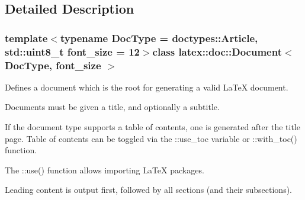 \subsection{Detailed Description}
\subsubsection*{template$<$typename Doc\-Type = doctypes\-::\-Article, std\-::uint8\-\_\-t font\-\_\-size = 12$>$class latex\-::doc\-::\-Document$<$ Doc\-Type, font\-\_\-size $>$}

Defines a document which is the root for generating a valid La\-Te\-X document.

Documents must be given a title, and optionally a subtitle.

If the document type supports a table of contents, one is generated after the title page. Table of contents can be toggled via the {\ttfamily \-::use\-\_\-toc} variable or {\ttfamily \-::with\-\_\-toc()} function.

The {\ttfamily \-::use()} function allows importing La\-Te\-X packages.

Leading content is output first, followed by all sections (and their subsections). 

